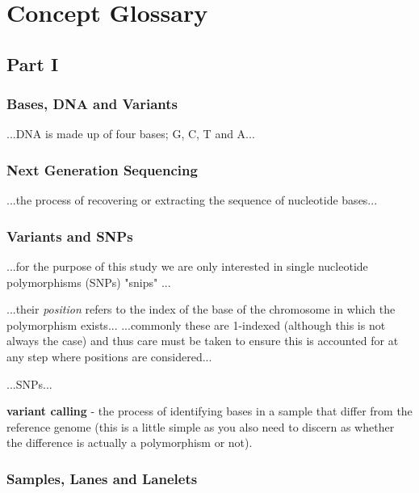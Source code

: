\chapter{Concept Glossary}
\label{app:concepts}

\section{Part I}
\label{app:concepts-p1}
\subsection{Bases, DNA and Variants}

...DNA is made up of four bases; G, C, T and A...


\subsection{Next Generation Sequencing}

...the process of recovering or extracting the sequence of nucleotide bases...


\subsection{Variants and SNPs}
\label{sec:p1-concept:variants}

...for the purpose of this study we are only interested in single nucleotide
polymorphisms (SNPs) "snips" ...

...their \textit{position} refers to the index of the base of the chromosome in
which the polymorphism exists...
...commonly these are 1-indexed (although this is not always the case) and thus
care must be taken to ensure this is accounted for at any step where positions
are considered...

...SNPs...

\textbf{variant calling} - the process of identifying bases in a sample that
differ from the reference genome (this is a little simple as you also need to
discern as whether the difference is actually a polymorphism or not).



\subsection{Samples, Lanes and Lanelets}
\label{chap:samplelanelanelets}
\ifpdf
    \graphicspath{{Chapter2/Figs/Raster/}{Chapter2/Figs/PDF/}{Chapter2/Figs/}}
\else
    \graphicspath{{Chapter2/Figs/Vector/}{Chapter2/Figs/}}
\fi

